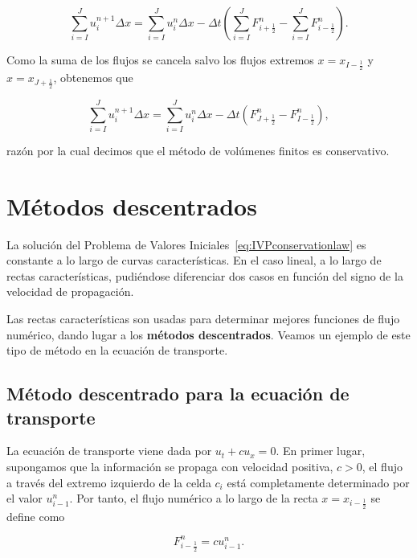 \begin{equation*}
  \sum_{i=I}^{J}
  u^{n+1}_{i}
  \Delta x=
  \sum_{i=I}^{J}
  u^{n}_{i}
  \Delta x-
  \Delta t
  \left(
  \sum_{i=I}^{J}
  F^{n}_{i+\frac{1}{2}}-
  \sum_{i=I}^{J}
  F^{n}_{i-\frac{1}{2}}
  \right).
\end{equation*}

Como la suma de los flujos se cancela salvo los flujos extremos
$x=x_{I-\frac{1}{2}}$ y $x=x_{J+\frac{1}{2}}$, obtenemos que

\begin{equation}\label{eq:conservative}
  \sum_{i=I}^{J}
  u^{n+1}_{i}
  \Delta x=
  \sum_{i=I}^{J}
  u^{n}_{i}
  \Delta x-
  \Delta t
  \left(
  F^{n}_{J+\frac{1}{2}}-
  F^{n}_{I-\frac{1}{2}}
  \right),
\end{equation}

razón por la cual decimos que el método de volúmenes finitos es
conservativo.

\section{Métodos descentrados}

La solución del Problema de Valores
Iniciales~\eqref{eq:IVPconservationlaw} es constante a lo largo de
curvas características.
En el caso lineal, a lo largo de rectas características, pudiéndose
diferenciar dos casos en función del signo de la velocidad de
propagación. %


Las rectas características son usadas para determinar mejores
funciones de flujo numérico, dando lugar a los
\textbf{métodos descentrados}.
Veamos un ejemplo de este tipo de método en la ecuación de
transporte.

\subsection*{Método descentrado para la ecuación de transporte}

La ecuación de transporte viene dada por $u_{t}+cu_{x}=0$.
En primer lugar, supongamos que la información se propaga con
velocidad positiva, $c>0$, el flujo a través del extremo
izquierdo de la celda $c_{i}$ está completamente determinado por el
valor $u^{n}_{i-1}$.
Por tanto, el flujo numérico a lo largo de la recta
$x=x_{i-\frac{1}{2}}$ se define como

\begin{equation*}
  F^{n}_{i-\frac{1}{2}}=
  cu^{n}_{i-1}.
\end{equation*}

